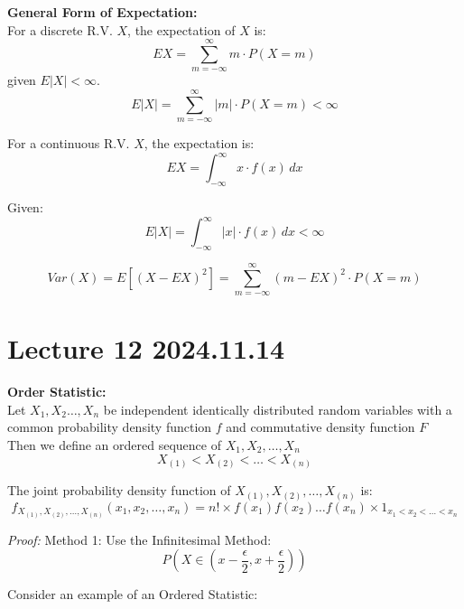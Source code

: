 \documentclass{article}
\begin{document}
\begin{definition}
    \textbf{General Form of Expectation:}\\
    For a discrete R.V. $X$, the expectation of $X$ is:
    \[ EX = \sum_{m=-\infty}^{\infty} m\cdot P(X=m) \]
    given $E|X| < \infty$.
    \[ E|X| = \sum_{m=-\infty}^{\infty} |m|\cdot P(X=m) <\infty \]
    
    For a continuous R.V. $X$, the expectation is:
    \[ EX = \int_{-\infty}^{\infty} x \cdot f(x) \, dx \]
    
    Given:
    \[ E|X| = \int_{-\infty}^{\infty} |x| \cdot f(x) \, dx < \infty \]
    
\end{definition}
\[ Var(X) = E[(X-EX)^{2}] = \sum_{m=-\infty}^{\infty} (m-EX)^{2} \cdot P(X=m) \]








\section{Lecture 12 2024.11.14}
\begin{definition}
    \textbf{Order Statistic:}\\
    Let $X_1, X_2\dots, X_n$ be independent identically distributed random variables with a common probability density function $f$ and commutative density function $F$\\
    Then we define an ordered sequence of $X_1,X_2,\dots, X_n$
    \begin{equation*}
        X_{(1)} < X_{(2)} < \dots < X_{(n)}
    \end{equation*}
\end{definition}
\begin{theorem}
    The joint probability density function of $X_{(1)}, X_{(2)}, \dots, X_{(n)}$ is:
    \begin{equation*}
        f_{X_{(1)},X_{(2)},\dots,X_{(n)}}(x_1,x_2,\dots,x_n) = n! \times f(x_1)f(x_2)\dots f(x_n) \times 1_{x_1 < x_2 < \dots < x_n}
    \end{equation*}
\end{theorem}
\emph{Proof:}
Method 1: Use the Infinitesimal Method:
\begin{equation*}
    P(X \in (x - \frac{\epsilon}{2}, x + \frac{\epsilon}{2}))
\end{equation*}

Consider an example of an Ordered Statistic:
\end{document}
